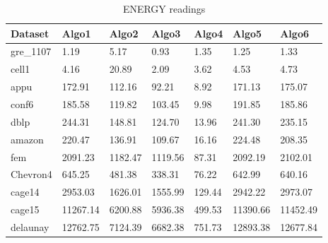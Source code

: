 \begin{table}[th]
\begin{center}
    \begin{tabular}{| l | l | l | l | l | l | l |}
    \hline
	Dataset & Algo1 & Algo2 & Algo3 & Algo4 & Algo5 & Algo6\\ \hline
	gre\_1107 & 1.19 & 5.17 & 0.93 & 1.35 & 1.25 & 1.33 \\ \hline
	cell1 & 4.16 & 20.89 & 2.09 & 3.62 & 4.53 & 4.73\\ \hline
	appu & 172.91 & 112.16 & 92.21 & 8.92 & 171.13 & 175.07\\ \hline
	conf6 & 185.58 & 119.82 & 103.45 & 9.98 & 191.85 & 185.86\\ \hline
	dblp & 244.31 & 148.81 & 124.70 & 13.96 & 241.30 & 235.15\\ \hline
	amazon & 220.47 & 136.91 & 109.67 & 16.16 & 224.48 & 208.35\\ \hline
	fem & 2091.23 & 1182.47 & 1119.56 & 87.31 & 2092.19 & 2102.01\\ \hline
	Chevron4 & 645.25 & 481.38 & 338.31 & 76.22 & 642.99 & 640.16\\ \hline
	cage14 & 2953.03 & 1626.01 & 1555.99 & 129.44 & 2942.22 & 2973.07\\ \hline
	cage15 & 11267.14 & 6200.88 & 5936.38 & 499.53 & 11390.66 & 11452.49\\ \hline
	delaunay & 12762.75 & 7124.39 & 6682.38 & 751.73 & 12893.38 & 12677.84\\ \hline
    \hline
    \end{tabular}
\end{center}
\caption{\capfont ENERGY readings}
\label{tab:Table1}
\end{table}



